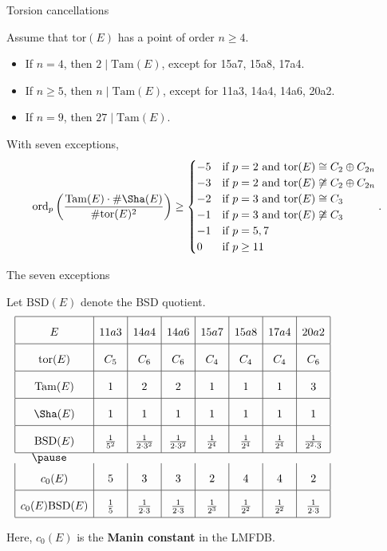 \documentclass[10pt]{beamer}
\begin{document}
\begin{frame}[t]{Torsion cancellations}

\begin{theorem}[Lorenzini, 2010]
Assume that $ \mathrm{tor}(E) $ has a point of order $ n \ge 4 $.
\begin{itemize}
\item If $ n = 4 $, then $ 2 \mid \mathrm{Tam}(E) $, except for 15a7, 15a8, 17a4.
\item If $ n \ge 5 $, then $ n \mid \mathrm{Tam}(E) $, except for 11a3, 14a4, 14a6, 20a2.
\item If $ n = 9 $, then $ 27 \mid \mathrm{Tam}(E) $.
\end{itemize}
\end{theorem}

\pause

\begin{corollary}
With seven exceptions,
$$ \mathrm{ord}_p\left(\dfrac{\mathrm{Tam}(E) \cdot \#\Sha(E)}{\#\mathrm{tor}(E)^2}\right) \ge \begin{cases}
-5 & \text{if} \ p = 2 \ \text{and} \ \mathrm{tor}(E) \cong C_2 \oplus C_{2n} \\
-3 & \text{if} \ p = 2 \ \text{and} \ \mathrm{tor}(E) \not\cong C_2 \oplus C_{2n} \\
-2 & \text{if} \ p = 3 \ \text{and} \ \mathrm{tor}(E) \cong C_3 \\
-1 & \text{if} \ p = 3 \ \text{and} \ \mathrm{tor}(E) \not\cong C_3 \\
-1 & \text{if} \ p = 5, 7 \\
0 & \text{if} \ p \ge 11
\end{cases}. $$
\end{corollary}

\end{frame}

\begin{frame}[t]{The seven exceptions}

Let $ \mathrm{BSD}(E) $ denote the BSD quotient.
$$
\renewcommand{\arraystretch}{2}
\begin{array}{|c|c|c|c|c|c|c|c|}
\hline
E & 11a3 & 14a4 & 14a6 & 15a7 & 15a8 & 17a4 & 20a2 \\
\hline
\mathrm{tor}(E) & C_5 & C_6 & C_6 & C_4 & C_4 & C_4 & C_6 \\
\hline
\mathrm{Tam}(E) & 1 & 2 & 2 & 1 & 1 & 1 & 3 \\
\hline
\Sha(E) & 1 & 1 & 1 & 1 & 1 & 1 & 1 \\
\hline
\mathrm{BSD}(E) & \tfrac{1}{5^2} & \tfrac{1}{2 \cdot 3^2} & \tfrac{1}{2 \cdot 3^2} & \tfrac{1}{2^4} & \tfrac{1}{2^4} & \tfrac{1}{2^4} & \tfrac{1}{2^2 \cdot 3} \\
\hline\noalign{\pause}
c_0(E) & 5 & 3 & 3 & 2 & 4 & 4 & 2 \\
\hline
c_0(E)\mathrm{BSD}(E) & \tfrac{1}{5} & \tfrac{1}{2 \cdot 3} & \tfrac{1}{2 \cdot 3} & \tfrac{1}{2^3} & \tfrac{1}{2^2} & \tfrac{1}{2^2} & \tfrac{1}{2 \cdot 3} \\
\hline
\end{array}
$$

Here, $ c_0(E) $ is the \textbf{Manin constant} in the LMFDB.

\end{frame}
\end{document}
